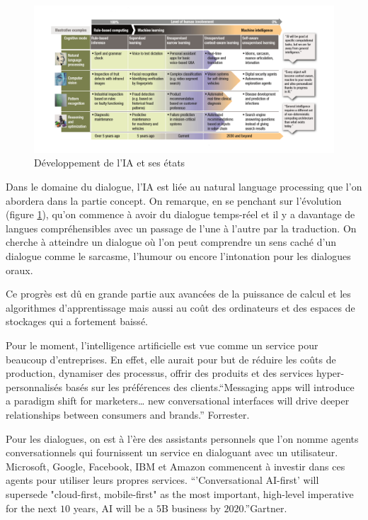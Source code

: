 \begin{figure}[H]
	\centering
		\includegraphics[width = \textwidth]{AI.png}
	\caption{Développement de l'IA et ses états}
	\label{fig:AI evolution}
\end{figure}



Dans le domaine du dialogue, l’IA est liée au natural language processing que l’on abordera dans la partie concept. On remarque, en se penchant sur l’évolution (figure \ref{fig:AI evolution}), qu’on commence à avoir du dialogue temps-réel et il y a davantage de langues compréhensibles avec un passage de l’une à l’autre par la traduction. On cherche à atteindre un dialogue où l’on peut comprendre un sens caché d’un dialogue comme le sarcasme, l’humour ou encore l’intonation pour les dialogues oraux.
\vspace{1em}

	Ce progrès est dû en grande partie aux avancées de la puissance de calcul et les algorithmes d’apprentissage mais aussi au coût des ordinateurs et des espaces de stockages qui a fortement baissé.
\vspace{1em}

	Pour le moment, l’intelligence artificielle est vue comme un service pour beaucoup d’entreprises. En effet, elle aurait pour but de réduire les coûts de production, dynamiser des processus, offrir des produits et des services hyper-personnalisés basés sur les préférences des clients.“Messaging apps will introduce a paradigm shift for marketers… new conversational interfaces will drive deeper relationships between consumers and brands.” Forrester.
\vspace{1em}


	Pour les dialogues, on est à l’ère des assistants personnels que l’on nomme agents conversationnels qui fournissent un service en dialoguant avec un utilisateur. Microsoft, Google, Facebook, IBM et Amazon commencent à investir dans ces agents pour utiliser leurs propres services.
“’Conversational AI-first’ will supersede "cloud-first, mobile-first" as the most important, high-level imperative for the next $10$ years, AI will be a $5$B business by $2020$.”Gartner.
\vspace{1em}



